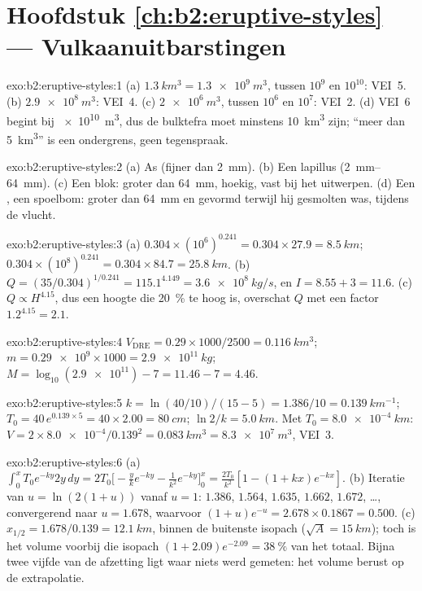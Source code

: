 \section*{Hoofdstuk \ref{ch:b2:eruptive-styles} --- Vulkaanuitbarstingen}

\begin{solution}{exo:b2:eruptive-styles:1}
(a) $\qty{1.3}{km^3} = \qty{1.3e9}{m^3}$, tussen $10^9$ en $10^{10}$: VEI~5.
(b) $\qty{2.9e8}{m^3}$: VEI~4. (c) $\qty{2e6}{m^3}$, tussen $10^6$ en $10^7$:
VEI~2. (d) VEI~6 begint bij \qty{e10}{m^3}, dus de bulktefra moet minstens
\qty{10}{km^3} zijn; ``meer dan \qty{5}{km^3}'' is een ondergrens, geen tegenspraak.
\end{solution}

\begin{solution}{exo:b2:eruptive-styles:2}
(a) As (fijner dan \qty{2}{mm}). (b) Een lapillus (\qtyrange{2}{64}{mm}).
(c) Een blok: groter dan \qty{64}{mm}, hoekig, vast bij het uitwerpen. (d) Een
, een spoelbom: groter dan \qty{64}{mm} en gevormd terwijl hij gesmolten was,
tijdens de vlucht.
\end{solution}

\begin{solution}{exo:b2:eruptive-styles:3}
(a) $0.304\times(10^6)^{0.241} = 0.304\times27.9 = \qty{8.5}{km}$;
$0.304\times(10^8)^{0.241} = 0.304\times84.7 = \qty{25.8}{km}$.
(b) $Q = (35/0.304)^{1/0.241} = 115.1^{4.149} = \qty{3.6e8}{kg/s}$, en $I =
8.55 + 3 = 11.6$. (c) $Q \propto H^{4.15}$, dus een hoogte die \qty{20}{\percent} te hoog is,
overschat $Q$ met een factor $1.2^{4.15} = 2.1$.
\end{solution}

\begin{solution}{exo:b2:eruptive-styles:4}
$V_{\mathrm{DRE}} = 0.29\times1000/2500 = \qty{0.116}{km^3}$; $m =
\num{0.29e9}\times1000 = \qty{2.9e11}{kg}$; $M = \log_{10}(\num{2.9e11}) - 7 = 11.46
- 7 = 4.46$.
\end{solution}

\begin{solution}{exo:b2:eruptive-styles:5}
$k = \ln(40/10)/(15 - 5) = 1.386/10 = \qty{0.139}{km^{-1}}$; $T_0 = 40\,e^{0.139\times5}
= 40\times2.00 = \qty{80}{cm}$; $\ln2/k = \qty{5.0}{km}$. Met $T_0 =
\qty{8.0e-4}{km}$: $V = 2\times\num{8.0e-4}/0.139^2 = \qty{0.083}{km^3} =
\qty{8.3e7}{m^3}$, VEI~3.
\end{solution}

\begin{solution}{exo:b2:eruptive-styles:6}
(a) $\int_0^x T_0e^{-ky}2y\,dy = 2T_0\big[-\tfrac{y}{k}e^{-ky} - \tfrac{1}{k^2}e^{-ky}\big]_0^x
= \tfrac{2T_0}{k^2}[1 - (1 + kx)e^{-kx}]$. (b) Iteratie van $u = \ln(2(1 + u))$ vanaf
$u = 1$: $1.386$, $1.564$, $1.635$, $1.662$, $1.672$, \dots, convergerend naar
$u = 1.678$, waarvoor $(1 + u)e^{-u} = 2.678\times0.1867 = 0.500$. (c) $x_{1/2} =
1.678/0.139 = \qty{12.1}{km}$, binnen de buitenste isopach ($\sqrt A =
\qty{15}{km}$); toch is het volume voorbij die isopach $(1 + 2.09)e^{-2.09} =
\qty{38}{\percent}$ van het totaal. Bijna twee vijfde van de afzetting ligt waar
niets werd gemeten: het volume berust op de extrapolatie.
\end{solution}

